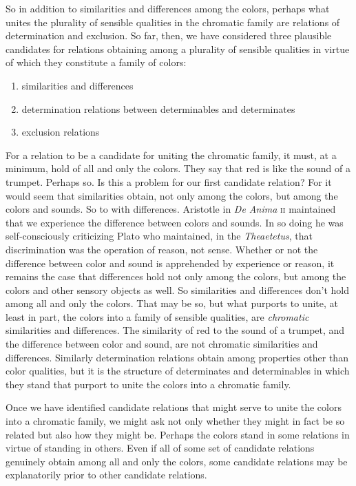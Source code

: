 \documentclass[12pt]{article}
\begin{document}
So in addition to similarities and differences among the colors, perhaps what unites the plurality of sensible qualities in the chromatic family are relations of determination and exclusion. So far, then, we have considered three plausible candidates for relations obtaining among a plurality of sensible qualities in virtue of which they constitute a family of colors:
\begin{enumerate}
	\item similarities and differences
	\item determination relations between determinables and determinates
	\item exclusion relations
\end{enumerate}
For a relation to be a candidate for uniting the chromatic family, it must, at a minimum, hold of all and only the colors. They say that red is like the sound of a trumpet. Perhaps so. Is this a problem for our first candidate relation? For it would seem that similarities obtain, not only among the colors, but among the colors and sounds. So to with differences. Aristotle in \emph{De Anima} \textsc{ii} maintained that we experience the difference between colors and sounds. In so doing he was self-consciously criticizing Plato who maintained, in the \emph{Theaetetus}, that discrimination was the operation of reason, not sense. Whether or not the difference between color and sound is apprehended by experience or reason, it remains the case that differences hold not only among the colors, but among the colors and other sensory objects as well. So similarities and differences don't hold among all and only the colors. That may be so, but what purports to unite, at least in part, the colors into a family of sensible qualities, are \emph{chromatic} similarities and differences. The similarity of red to the sound of a trumpet, and the difference between color and sound, are not chromatic similarities and differences. Similarly determination relations obtain among properties other than color qualities, but it is the structure of determinates and determinables in which they stand that purport to unite the colors into a chromatic family.

Once we have identified candidate relations that might serve to unite the colors into a chromatic family, we might ask not only whether they might in fact be so related but also how they might be. Perhaps the colors stand in some relations in virtue of standing in others. Even if all of some set of candidate relations genuinely obtain among all and only the colors, some candidate relations may be explanatorily prior to other candidate relations.
\end{document}
